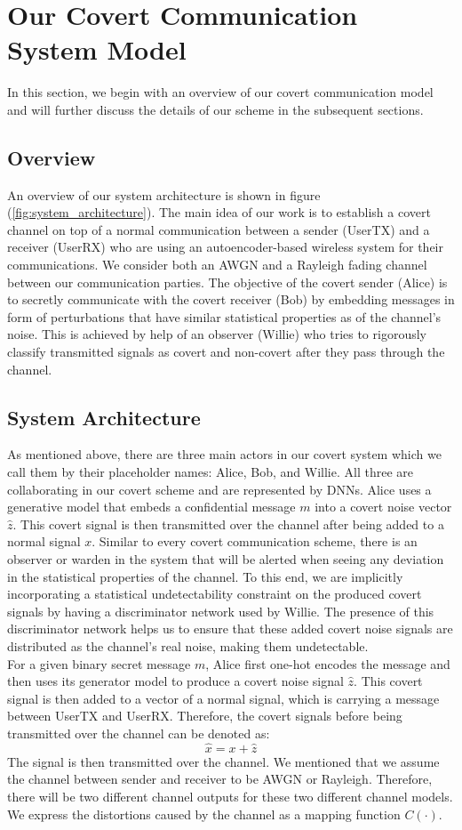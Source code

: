 \section{Our Covert Communication System Model}
\label{s:model}
In this section, we begin with an overview of our covert communication model and will further discuss the details of our scheme in the subsequent sections.
\subsection{Overview}
An overview of our system architecture is shown in figure (\ref{fig:system_architecture}). The main idea of our work is to establish a covert channel on top of a normal communication between a sender (UserTX) and a receiver (UserRX) who are using an autoencoder-based wireless system for their communications. We consider both an AWGN and a Rayleigh fading channel between our communication parties. The objective of the covert sender (Alice) is to secretly communicate with the covert receiver (Bob) by embedding messages in form of perturbations that have similar statistical properties as of the channel's noise. This is achieved by help of an observer (Willie) who tries to rigorously classify transmitted signals as covert and non-covert after they pass through the channel.\\
\subsection{System Architecture}
As mentioned above, there are three main actors in our covert system which we call them by their placeholder names: Alice, Bob, and Willie. All three are collaborating in our covert scheme and are represented by DNNs. Alice uses a generative model that embeds a confidential message \(m\) into a covert noise vector \(\hat{z}\). This covert signal is then transmitted over the channel after being added to a normal signal \(x\). Similar to every covert communication scheme, there is an observer or warden in the system that will be alerted when seeing any deviation in the statistical properties of the channel. To this end, we are implicitly incorporating a statistical undetectability constraint on the produced covert signals by having a discriminator network used by Willie. The presence of this discriminator network helps us to ensure that these added covert noise signals are distributed as the channel's real noise, making them undetectable.\\
For a given binary secret message \(m\), Alice first one-hot encodes the message and then uses its generator model to produce a covert noise signal \(\hat{z}\). This covert signal is then added to a vector of a normal signal, which is carrying a message between UserTX and UserRX. Therefore, the covert signals before being transmitted over the channel can be denoted as:
\begin{equation}
	\hat{x} = x + \hat{z}
\end{equation}
The signal is then transmitted over the channel. We mentioned that we assume the channel between sender and receiver to be AWGN or Rayleigh. Therefore, there will be two different channel outputs for these two different channel models. We express the distortions caused by the channel as a mapping function \(C(\cdot)\).

